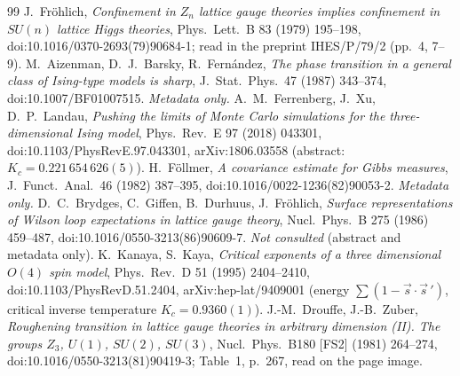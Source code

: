 \documentclass[11pt,a4paper]{article}
\theoremstyle{remark}
\theoremstyle{definition}
\theoremstyle{plain}
\theoremstyle{remark}
\begin{document}
\begin{thebibliography}{99}
 J.~Fr\"ohlich, \emph{Confinement in $Z_n$ lattice gauge theories implies confinement in $SU(n)$ lattice Higgs theories}, Phys.\ Lett.\ B 83 (1979) 195--198,
doi:10.1016/0370-2693(79)90684-1; read in the preprint IHES/P/79/2 (pp.~4, 7--9).
 M.~Aizenman, D.~J.~Barsky, R.~Fern\'andez, \emph{The phase transition in a general class of Ising-type models is sharp}, J.\ Stat.\ Phys.\ 47 (1987) 343--374,
doi:10.1007/BF01007515. \emph{Metadata only.}
 A.~M.~Ferrenberg, J.~Xu, D.~P.~Landau, \emph{Pushing the limits of Monte Carlo simulations for the three-dimensional Ising model}, Phys.\ Rev.\ E 97 (2018) 043301,
doi:10.1103/PhysRevE.97.043301, arXiv:1806.03558 (abstract: $K_c=0.221\,654\,626(5)$).
 H.~F\"ollmer, \emph{A covariance estimate for Gibbs measures}, J.\ Funct.\ Anal.\ 46 (1982) 387--395, doi:10.1016/0022-1236(82)90053-2. \emph{Metadata only.}
 D.~C.~Brydges, C.~Giffen, B.~Durhuus, J.~Fr\"ohlich, \emph{Surface representations of Wilson loop expectations in lattice gauge theory}, Nucl.\ Phys.\ B 275 (1986) 459--487,
doi:10.1016/0550-3213(86)90609-7. \emph{Not consulted} (abstract and metadata only).
 K.~Kanaya, S.~Kaya, \emph{Critical exponents of a three dimensional $O(4)$ spin model}, Phys.\ Rev.\ D 51 (1995) 2404--2410, doi:10.1103/PhysRevD.51.2404, arXiv:hep-lat/9409001
(energy $\sum(1-\vec s\cdot\vec s\,')$, critical inverse temperature $K_c=0.9360(1)$).
 J.-M.~Drouffe, J.-B.~Zuber, \emph{Roughening transition in lattice gauge theories in arbitrary dimension (II). The groups $Z_3$, $U(1)$, $SU(2)$, $SU(3)$},
Nucl.\ Phys.\ B180 [FS2] (1981) 264--274, doi:10.1016/0550-3213(81)90419-3; Table~1, p.~267, read on the page image.

\end{thebibliography}
\end{document}
